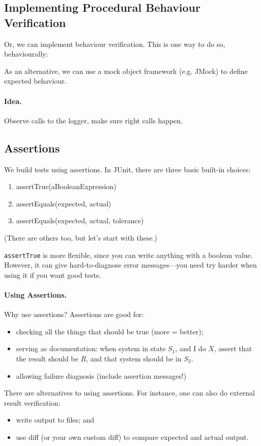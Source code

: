 \documentclass[11pt]{article}
\newenvironment{itemizep}{
 \begin{itemize}
  \setlength{\itemsep}{0pt}
  \setlength{\parsep}{3pt}
  \setlength{\topsep}{3pt}
  \setlength{\partopsep}{0pt}
  \setlength{\leftmargin}{1.5em}
  \setlength{\labelwidth}{1em}
  \setlength{\labelsep}{0.5em} }
 {\end{itemize}}
\newenvironment{enumeratep}{
 \begin{enumerate}
  \setlength{\itemsep}{0pt}
  \setlength{\parsep}{3pt}
  \setlength{\topsep}{3pt}
  \setlength{\partopsep}{0pt}
  \setlength{\leftmargin}{1.5em}
  \setlength{\labelwidth}{1em}
  \setlength{\labelsep}{0.5em} }
 {\end{enumerate}}
\begin{document}
\newpage
\subsection*{Implementing Procedural Behaviour Verification}
Or, we can implement behaviour verification. This is one
way to do so, behaviourally:

As an alternative, we can use a mock object framework (e.g. JMock) to
define expected behaviour.

\paragraph{Idea.} Observe calls to the logger,
make sure right calls happen.

\subsection*{Assertions}
We build tests using assertions. 
In JUnit, there are three basic built-in choices:
\begin{enumeratep}
\item assertTrue(aBooleanExpression)
\item assertEquals(expected, actual)
\item assertEquals(expected, actual, tolerance)
\end{enumeratep}
(There are others too, but let's start with these.)

{\tt assertTrue} is more flexible, since you can
write anything with a boolean value. However, it can give
hard-to-diagnose error messages---you need try harder when using it
if you want good tests.

\paragraph{Using Assertions.}
Why use assertions? Assertions are good for:
\begin{itemizep}
\item checking all the things that should be true (more = better);
\item serving as documentation:
    when system in state $S_1$,
    and I do $X$,
    assert that the result should be $R$, and
    that system should be in $S_2$.
\item allowing failure diagnosis (include assertion messages!)
\end{itemizep}

There are alternatives to using assertions.
For instance, one can also do external result verification:
\begin{itemizep}
\item write output to files; and
\item use diff (or your own custom diff) to compare
  expected and actual output.
\end{itemizep}
\end{document}
